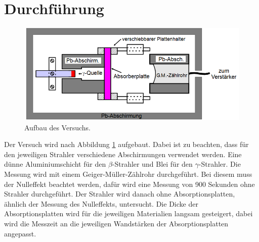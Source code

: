 \section{Durchführung}
\label{sec:Durchführung}
\begin{figure}[H]
    \centering
    \includegraphics[width=\textwidth]{content/Aufbau.png}
    \caption{Aufbau des Versuchs. \cite{v704}}
    \label{fig:mess}
\end{figure}
\noindent
Der Versuch wird nach Abbildung \ref{fig:mess} aufgebaut.
Dabei ist zu beachten, dass für  den jeweiligen Strahler verschiedene Abschirmungen verwendet werden.
Eine dünne Aluminiumschicht für den $\beta$-Strahler und Blei für den $\gamma$-Strahler.
Die Messung wird mit einem Geiger-Müller-Zählrohr durchgeführt.
Bei diesem muss der Nulleffekt beachtet werden, dafür wird eine Messung von 900 Sekunden ohne Strahler durchgeführt.
Der Strahler wird danach ohne Absorptionsplatten, ähnlich der Messung des Nulleffekts, untersucht.
Die Dicke der Absorptionsplatten wird für die jeweiligen Materialien langsam gesteigert, dabei wird die Messzeit an die jeweiligen Wandstärken der Absorptionsplatten angepasst.
